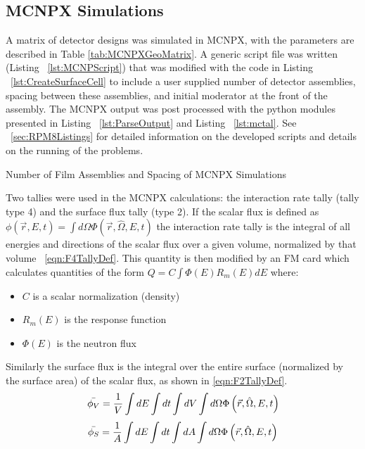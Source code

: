 \subsection{MCNPX Simulations}
\label{sec:MCNPXMethods}
A matrix of detector designs was simulated in MCNPX, with the parameters are described in Table \ref{tab:MCNPXGeoMatrix}.
A generic script file was written (Listing ~\ref{lst:MCNPScript}) that was modified with the code in Listing ~\ref{lst:CreateSurfaceCell} to include a user supplied number of detector assemblies, spacing between these assemblies, and initial moderator at the front of the assembly.
The MCNPX output was post processed with the python modules presented in Listing ~\ref{lst:ParseOutput} and Listing ~\ref{lst:mctal}.
See ~\ref{sec:RPM8Listings} for detailed information on the developed scripts and details on the running of the problems.
\begin{table}
	\caption{Number of Film Assemblies and Spacing of MCNPX Simulations}
	\label{tab:MCNPXGeoMatrix}
  \centering
	
\end{table}

Two tallies were used in the MCNPX calculations: the interaction rate tally (tally type 4) and the surface flux tally (type 2).
If the scalar flux is defined as $\phi(\vec{r},E,t)=\int d\Omega \Phi(\vec{r},\hat{\Omega},E,t)$ the  interaction rate tally is the integral of all energies and directions of the scalar flux over a given volume, normalized by that volume ~\eqref{eqn:F4TallyDef}.
This quantity is then modified by an FM card which calculates quantities of the form $Q = C \int {\Phi(E) R_m(E) dE }$ where:
\begin{itemize}
    \item $C$ is a scalar normalization (density)
    \item $R_m(E)$ is the response function
    \item $\Phi(E)$ is the neutron flux
\end{itemize}
Similarly the surface flux is the integral over the entire surface (normalized by the surface area) of the scalar flux, as shown in \eqref{eqn:F2TallyDef}.
\begin{align}
    \label{eqn:F4TallyDef}
    \bar{\phi_V} = \frac{1}{V}\int dE \int dt \int dV \int d\Omega \Phi \left ( \vec{r},\hat{\Omega},E,t \right )
\end{align}
\begin{align}
    \label{eqn:F2TallyDef}
    \bar{\phi_S} = \frac{1}{A}\int dE \int dt \int dA \int d\Omega \Phi \left ( \vec{r},\hat{\Omega},E,t \right )
\end{align}

